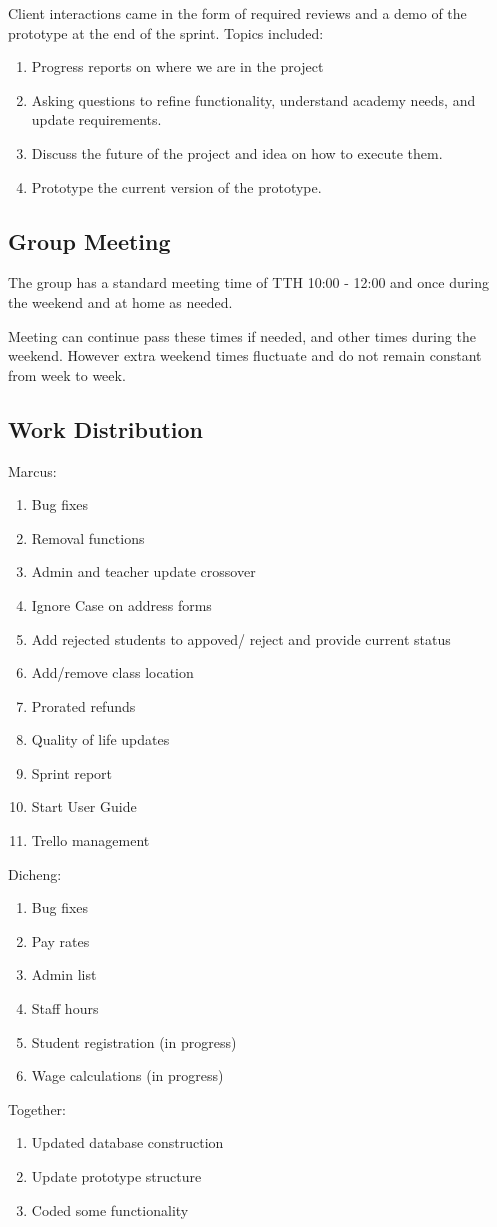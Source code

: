 Client interactions came in the form of required reviews and a demo of the prototype at the end of the sprint. Topics included:

\begin{enumerate}
\item Progress reports on where we are in the project
\item Asking questions to refine functionality, understand academy needs, and update requirements.
\item Discuss the future of the project and idea on how to execute them.
\item Prototype the current version of the prototype.
\end{enumerate}


\subsection{Group Meeting}

The group has a standard meeting time of TTH 10:00 - 12:00 and once during the weekend and at home as needed.  

Meeting can continue pass these times if needed, and other times during the weekend. However extra weekend times fluctuate and do not remain constant from week to week. 

\subsection{Work Distribution}

Marcus:
\begin{enumerate}
\item Bug fixes
\item Removal functions
\item Admin and teacher update crossover
\item Ignore Case on address forms
\item Add rejected students to appoved/ reject and provide current status
\item Add/remove class location
\item Prorated refunds
\item Quality of life updates
\item Sprint report
\item Start User Guide
\item Trello management\\
\end{enumerate}

Dicheng:
\begin{enumerate}
\item Bug fixes
\item Pay rates
\item Admin list
\item Staff hours
\item Student registration (in progress)
\item Wage calculations (in progress)
\end{enumerate}


Together:
\begin{enumerate}
\item Updated database construction
\item Update prototype structure
\item Coded some functionality
\end{enumerate}

